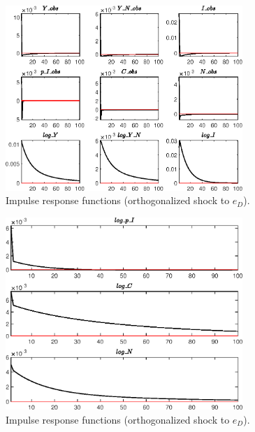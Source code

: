 \begin{figure}[H]
\centering 
\includegraphics[width=0.80\textwidth]{BRS_growth_res/graphs/BRS_growth_res_IRF_e_D1}
\caption{Impulse response functions (orthogonalized shock to ${e_D}$).}\label{Fig:IRF:e_D:1}
\end{figure}
 
\begin{figure}[H]
\centering 
\includegraphics[width=0.80\textwidth]{BRS_growth_res/graphs/BRS_growth_res_IRF_e_D2}
\caption{Impulse response functions (orthogonalized shock to ${e_D}$).}\label{Fig:IRF:e_D:2}
\end{figure}
 
 
